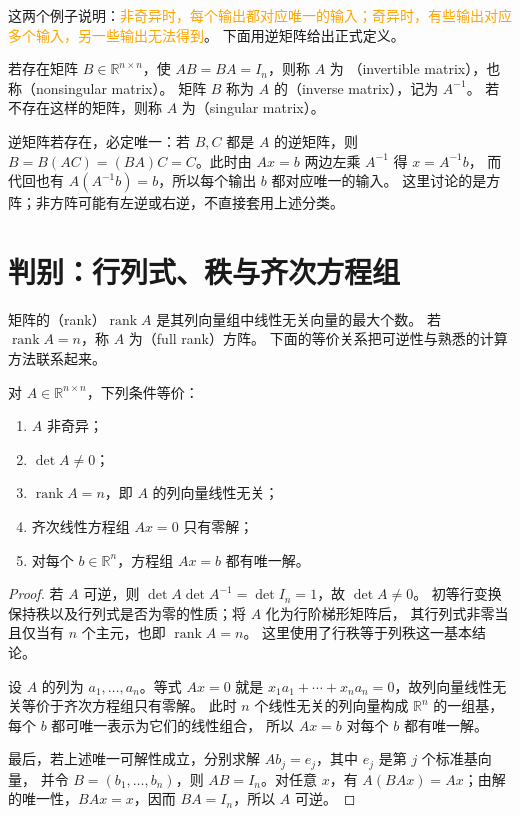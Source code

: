 \documentclass[UTF8,12pt,a4paper,fontset=fandol]{ctexart}
\begin{document}
\begin{inputoutputbox}
这两个例子说明：\textcolor{orange}{非奇异时，每个输出都对应唯一的输入；奇异时，有些输出对应多个输入，另一些输出无法得到}。
下面用逆矩阵给出正式定义。
\end{inputoutputbox}

\begin{definition}[非奇异矩阵与奇异矩阵]
若存在矩阵 $B\in\mathbb R^{n\times n}$，使 $AB=BA=I_n$，则称 $A$ 为
（invertible matrix），也称（nonsingular matrix）。
矩阵 $B$ 称为 $A$ 的（inverse matrix），记为 $A^{-1}$。
若不存在这样的矩阵，则称 $A$ 为（singular matrix）。
\end{definition}

逆矩阵若存在，必定唯一：若 $B,C$ 都是 $A$ 的逆矩阵，则
$B=B(AC)=(BA)C=C$。此时由 $Ax=b$ 两边左乘 $A^{-1}$ 得 $x=A^{-1}b$，
而代回也有 $A(A^{-1}b)=b$，所以每个输出 $b$ 都对应唯一的输入。
这里讨论的是方阵；非方阵可能有左逆或右逆，不直接套用上述分类。

\section{判别：行列式、秩与齐次方程组}

矩阵的（rank）$\operatorname{rank}A$ 是其列向量组中线性无关向量的最大个数。
若 $\operatorname{rank}A=n$，称 $A$ 为（full rank）方阵。
下面的等价关系把可逆性与熟悉的计算方法联系起来。

\begin{theorem}[非奇异矩阵的等价判别]
\label{thm:nonsingular-criteria}
对 $A\in\mathbb R^{n\times n}$，下列条件等价：
\begin{enumerate}
  \item $A$ 非奇异；
  \item $\det A\ne0$；
  \item $\operatorname{rank}A=n$，即 $A$ 的列向量线性无关；
  \item 齐次线性方程组 $Ax=0$ 只有零解；
  \item 对每个 $b\in\mathbb R^n$，方程组 $Ax=b$ 都有唯一解。
\end{enumerate}
\end{theorem}

\begin{proof}
若 $A$ 可逆，则 $\det A\det A^{-1}=\det I_n=1$，故 $\det A\ne0$。
初等行变换保持秩以及行列式是否为零的性质；将 $A$ 化为行阶梯形矩阵后，
其行列式非零当且仅当有 $n$ 个主元，也即 $\operatorname{rank}A=n$。
这里使用了行秩等于列秩这一基本结论。

设 $A$ 的列为 $a_1,\ldots,a_n$。等式 $Ax=0$ 就是
$x_1a_1+\cdots+x_na_n=0$，故列向量线性无关等价于齐次方程组只有零解。
此时 $n$ 个线性无关的列向量构成 $\mathbb R^n$ 的一组基，每个 $b$ 都可唯一表示为它们的线性组合，
所以 $Ax=b$ 对每个 $b$ 都有唯一解。

最后，若上述唯一可解性成立，分别求解 $Ab_j=e_j$，其中 $e_j$ 是第 $j$ 个标准基向量，
并令 $B=(b_1,\ldots,b_n)$，则 $AB=I_n$。对任意 $x$，有
$A(BAx)=Ax$；由解的唯一性，$BAx=x$，因而 $BA=I_n$，所以 $A$ 可逆。
\end{proof}
\end{document}
